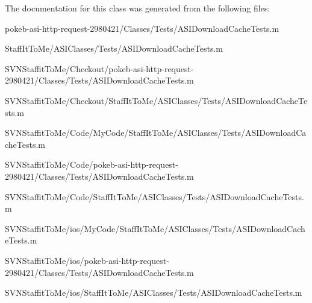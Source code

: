 \-The documentation for this class was generated from the following files\-:\begin{DoxyCompactItemize}
\item 
pokeb-\/asi-\/http-\/request-\/2980421/\-Classes/\-Tests/\-A\-S\-I\-Download\-Cache\-Tests.\-m\item 
\-Staff\-It\-To\-Me/\-A\-S\-I\-Classes/\-Tests/\-A\-S\-I\-Download\-Cache\-Tests.\-m\item 
\-S\-V\-N\-Staffit\-To\-Me/\-Checkout/pokeb-\/asi-\/http-\/request-\/2980421/\-Classes/\-Tests/\-A\-S\-I\-Download\-Cache\-Tests.\-m\item 
\-S\-V\-N\-Staffit\-To\-Me/\-Checkout/\-Staff\-It\-To\-Me/\-A\-S\-I\-Classes/\-Tests/\-A\-S\-I\-Download\-Cache\-Tests.\-m\item 
\-S\-V\-N\-Staffit\-To\-Me/\-Code/\-My\-Code/\-Staff\-It\-To\-Me/\-A\-S\-I\-Classes/\-Tests/\-A\-S\-I\-Download\-Cache\-Tests.\-m\item 
\-S\-V\-N\-Staffit\-To\-Me/\-Code/pokeb-\/asi-\/http-\/request-\/2980421/\-Classes/\-Tests/\-A\-S\-I\-Download\-Cache\-Tests.\-m\item 
\-S\-V\-N\-Staffit\-To\-Me/\-Code/\-Staff\-It\-To\-Me/\-A\-S\-I\-Classes/\-Tests/\-A\-S\-I\-Download\-Cache\-Tests.\-m\item 
\-S\-V\-N\-Staffit\-To\-Me/ios/\-My\-Code/\-Staff\-It\-To\-Me/\-A\-S\-I\-Classes/\-Tests/\-A\-S\-I\-Download\-Cache\-Tests.\-m\item 
\-S\-V\-N\-Staffit\-To\-Me/ios/pokeb-\/asi-\/http-\/request-\/2980421/\-Classes/\-Tests/\-A\-S\-I\-Download\-Cache\-Tests.\-m\item 
\-S\-V\-N\-Staffit\-To\-Me/ios/\-Staff\-It\-To\-Me/\-A\-S\-I\-Classes/\-Tests/\-A\-S\-I\-Download\-Cache\-Tests.\-m\end{DoxyCompactItemize}
